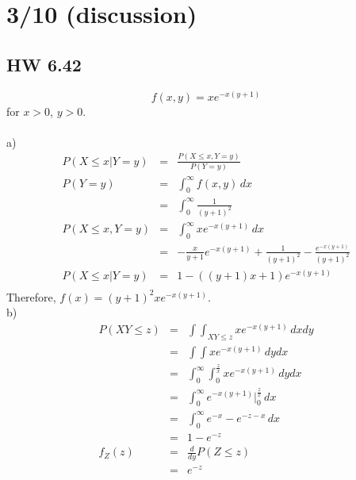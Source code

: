 \section*{3/10 (discussion)}
  \subsection*{HW 6.42}
    $$
      f(x,y) = xe^{-x(y+1)}
    $$
    for $x > 0$, $y > 0$.\\\\
    a) 
    \begin{eqnarray*}
      P(X \le x | Y = y) & = & \frac{P(X \le x, Y = y)}{P(Y = y)}\\
      P(Y = y) & = & \int_0^{\infty} f(x,y)\,dx\\
      & = & \int_0^{\infty} \frac{1}{(y+1)^2}\\
      P(X \le x, Y = y) & = & \int_0^{\infty}xe^{-x(y+1)}\,dx\\
      & = & - \frac{x}{y+1} e^{-x(y+1)} + \frac{1}{(y+1)^2} - \frac{e^{-x(y+1)}
      }{(y+1)^2}\\
      P(X \le x | Y = y) & = & 1 - ((y+1)x + 1) e^{-x(y+1)}\\
    \end{eqnarray*}
    Therefore, $f(x) = (y+1)^2 xe^{-x(y+1)}$.\\
    b)
    \begin{eqnarray*}
      P(XY \le z) & = & \int\int_{XY \le z} xe^{-x(y+1)} \,dxdy\\
      & = & \int\int xe^{-x(y+1)}\,dydx\\
      & = & \int_0^{\infty} \int_0^{\frac{z}{x}} xe^{-x(y+1)}\,dydx\\
      & = & \int_0^{\infty} e^{-x(y+1)} |_0^{\frac{z}{x}} \,dx \\
      & = & \int_0^{\infty} e^{-x} - e^{-z - x}\,dx \\
      & = & 1 - e^{-z}\\
      f_Z(z) & = & \frac{d}{dy} P(Z \le z)\\
      & = & e^{-z}
    \end{eqnarray*}

